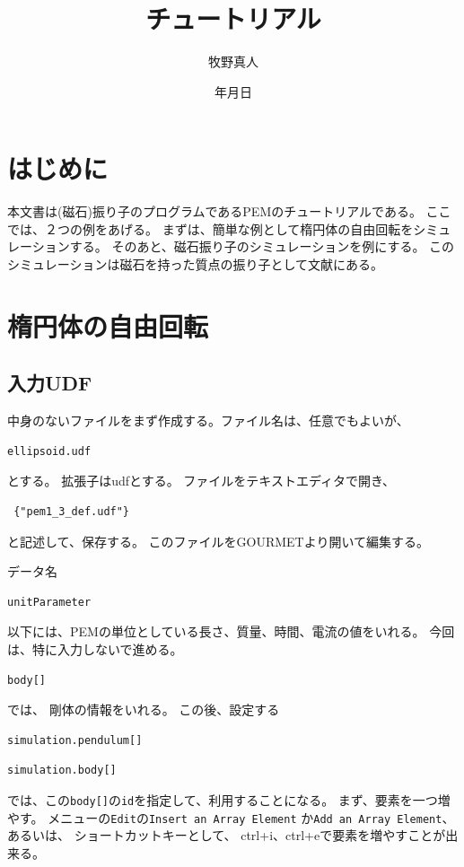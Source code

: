 \documentclass[a4paper,11pt]{jarticle}
\title{チュートリアル}
\author{牧野真人}
\date{\number\year 年\number\month 月\number\day 日}
\begin{document}
\maketitle
\section{はじめに}
本文書は(磁石)振り子のプログラムであるPEMのチュートリアルである。
ここでは、２つの例をあげる。
まずは、簡単な例として楕円体の自由回転をシミュレーションする。
そのあと、磁石振り子のシミュレーションを例にする。
このシミュレーションは磁石を持った質点の振り子として文献\cite{doi}にある。
\section{楕円体の自由回転}
\subsection{入力UDF}
中身のないファイルをまず作成する。ファイル名は、任意でもよいが、
\begin{verbatim}
ellipsoid.udf
\end{verbatim}
とする。
拡張子はudfとする。
ファイルをテキストエディタで開き、
\begin{verbatim}
 {"pem1_3_def.udf"}
\end{verbatim}
と記述して、保存する。
このファイルをGOURMETより開いて編集する。

データ名
\begin{verbatim}
unitParameter
\end{verbatim}
以下には、PEMの単位としている長さ、質量、時間、電流の値をいれる。
今回は、特に入力しないで進める。

\begin{verbatim}
body[]
\end{verbatim}
では、
剛体の情報をいれる。
この後、設定する
\begin{verbatim}
simulation.pendulum[]
\end{verbatim}
\begin{verbatim}
simulation.body[]
\end{verbatim}
では、この\verb|body[]|の\verb|id|を指定して、利用することになる。
まず、要素を一つ増やす。
メニューの\verb|Edit|の\verb|Insert an Array Element|
か\verb|Add an Array Element|、あるいは、
ショートカットキーとして、
ctrl+i、ctrl+eで要素を増やすことが出来る。
\end{document}
